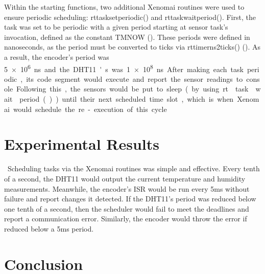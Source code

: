 \documentclass[letterpaper, 12pt]{article}
\begin{document}
\indent Within the starting functions, two additional Xenomai routines were used to ensure periodic scheduling: rt\textunderscore task\textunderscore set\textunderscore periodic() and rt\textunderscore task\textunderscore wait\textunderscore period().  First, the task was set to be periodic with a given period starting at sensor task's invocation, defined as the constant TM\textunderscore NOW (\cite{xenomai2018}).  These periods were defined in nanoseconds, as the period must be converted to ticks via rt\textunderscore timer\textunderscore ns2ticks() (\cite{xenomai2018}).  As a result, the encoder's period was \SI{5e6} ns and the DHT11's was \SI{1e8} ns.  After making each task periodic, its code segment would execute and report the sensor readings to console.  Following this, the sensors would be put to sleep (by using rt\textunderscore task\textunderscore wait\textunderscore period()) until their next scheduled time slot, which is when Xenomai would schedule the re-execution of this cycle.

~\newpage
\section{Experimental Results}
~\indent Scheduling tasks via the Xenomai routines was simple and effective.  Every tenth of a second, the DHT11 would output the current temperature and humidity measurements.  Meanwhile, the encoder's ISR would be run every 5ms without failure and report changes it detected.  If the DHT11's period was reduced below one tenth of a second, then the scheduler would fail to meet the deadlines and report a communication error.  Similarly, the encoder would throw the error if reduced below a 5ms period.  

\section{Conclusion}

~\newpage
\printbibliography
~\newpage
%
\end{document}
